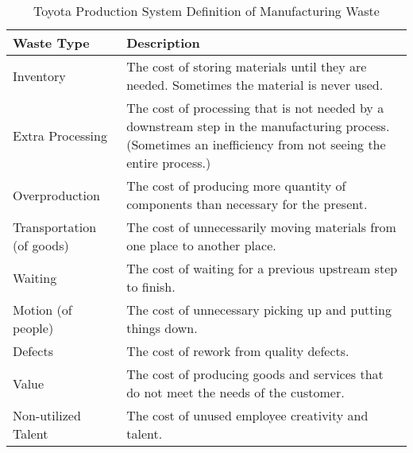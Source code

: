 \begin{table}[t]
\renewcommand{\arraystretch}{1.5}
\centering
\caption{Toyota Production System Definition of Manufacturing Waste}
\label{ManufacturingWaste}
\begin{tabular}{|p{0.85in}|p{2.3in}|}
\hline

Waste Type                & Description                                                                                                                                                  \\ \hline
Inventory                 & The cost of storing materials until they are needed. Sometimes the material is never used.                                                                   \\ \hline
Extra Processing          & The cost of processing that is not needed by a downstream step in the manufacturing process. (Sometimes an inefficiency from not seeing the entire process.) \\ \hline
Overproduction            & The cost of producing more quantity of components than necessary for the present.                                                                            \\ \hline
Transportation (of goods) & The cost of unnecessarily moving materials from one place to another place.                                                                                  \\ \hline
Waiting                   & The cost of waiting for a previous upstream step to finish.                                                                                                       \\ \hline
Motion (of people)        & The cost of unnecessary picking up and putting things down.                                                                                                  \\ \hline
Defects                   & The cost of rework from quality defects.                                                                                                                     \\ \hline
Value                     & The cost of producing goods and services that do not meet the needs of the customer.                                                                         \\ \hline
Non-utilized Talent       & The cost of unused employee creativity and talent.                                                                                                           \\ \hline
\end{tabular}
\end{table}


